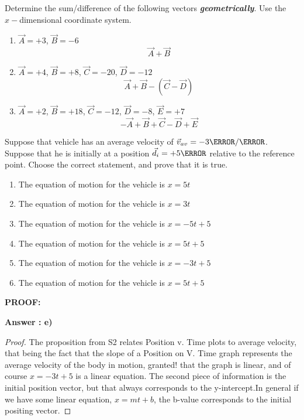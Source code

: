 \documentclass[12pt]{article} %
\begin{document}
\begin{qstn}[4]
	Determine the sum/difference of the following vectors \textbf{\emph{geometrically}}. Use the $x-$dimensional coordinate system.
	\begin{enumerate}[label=(\alph*)]
		\item $\vec A = +3$, $\vec B = -6$ $$\vec A + \vec B$$
		\vspace*{7cm}
		\item $\vec A = +4$, $\vec B = +8$, $\vec C = -20$, $\vec D = -12$   $$\vec A + \vec B - (\vec C - \vec D)$$
		\newpage
		\item $\vec A = +2$, $\vec B = +18$, $\vec C = -12$, $\vec D = -8$, $\vec E = +7$  $$-\vec A  + \vec B + \vec C - \vec D + \vec E$$
		\vspace*{7cm}
	\end{enumerate}

\end{qstn}

\begin{qstn}[5]
Suppose that vehicle has an average velocity of $\vec v_{av} = -3 \m / \s$. Suppose that he is initially at a position $\vec d_i = +5 \m$ relative to the reference point. Choose the correct statement, and prove that it is true.
	\begin{enumerate}[label = (\alph*)]
		\item The equation of motion for the vehicle is $x = 5t$
		\item The equation of motion for the vehicle is $x = 3t$
		\item The equation of motion for the vehicle is $x = -5t + 5$
		\item The equation of motion for the vehicle is $x = 5t + 5$
		\item The equation of motion for the vehicle is $x = -3t + 5$
		\item The equation of motion for the vehicle is $x = 5t + 5$
	\end{enumerate}

	

\textbf{PROOF: }
\begin{soln}
	\textbf{Answer : e)}
\begin{proof}
The proposition from S2 relates Position v. Time plots to average velocity, that being the fact that the slope of a Position on V. Time graph represents the average velocity of the body in motion, granted! that the graph is linear, and of course $x = -3t + 5$ is a linear equation. The second piece of information is the initial position vector, but that always corresponds to the y-intercept.In general if we have some linear equation, $x = mt + b$, the b-value corresponds to the initial positing vector.
\end{proof}
\end{soln}

\end{qstn}
\end{document}

